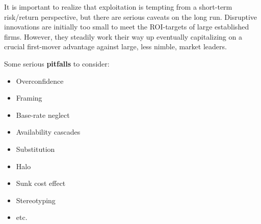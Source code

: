 \documentclass[a4paper]{extarticle}
\begin{document}
It is important to realize that exploitation is tempting from a short-term risk/return perspective, but there are serious caveats on the long run. Disruptive innovations are initially too small to meet the ROI-targets of large established firms. However, they steadily work their way up eventually capitalizing on a crucial first-mover advantage against large, less nimble, market leaders.

Some serious \textbf{pitfalls} to consider:

\begin{itemize}
    \item Overconfidence
    \item Framing
    \item Base-rate neglect
    \item Availability cascades
    \item Substitution
    \item Halo
    \item Sunk cost effect
    \item Stereotyping
    \item etc.
\end{itemize}
\end{document}
